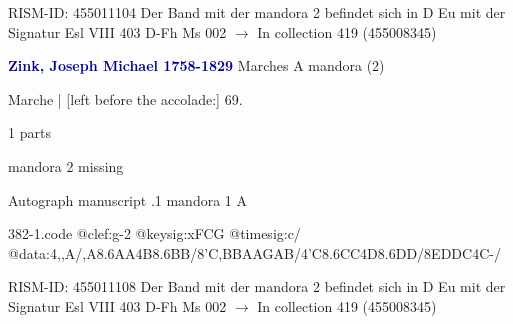 \documentclass[twocolumn]{book}
\begin{document}
\newline RISM-ID: 455011104
\newline Der Band mit der mandora 2 befindet sich in D Eu mit der Signatur Esl VIII 403
\newline D-Fh  Ms 002
\newline $\rightarrow$ In collection 419 (455008345)

\newline \par \vspace{7pt} \textcolor{darkblue}{\textbf{Zink, Joseph Michael  1758-1829}}
\newline Marches  A  
\newline mandora (2)
\newline \begin{itshape}[f.36r, at left:] Marche | [left before the accolade:] 69.\end{itshape} 
\newline \textcolor{darkblue}{}  1 parts  
\newline \begin{small} mandora 2 missing\end{small} 
\newline Autograph manuscript
.1  mandora 1  A  
\begin{filecontents*}{382-1.code}
@clef:g-2
@keysig:xFCG
@timesig:c/
@data:4,,A/,A{8.6AA}4B{8.6BB}/8'C,BBAAGAB/4'C{8.6CC}4D{8.6DD}/8EDDC4C-/
\end{filecontents*}
\newline
%

\newline RISM-ID: 455011108
\newline Der Band mit der mandora 2 befindet sich in D Eu mit der Signatur Esl VIII 403
\newline D-Fh  Ms 002
\newline $\rightarrow$ In collection 419 (455008345)
\end{document}
